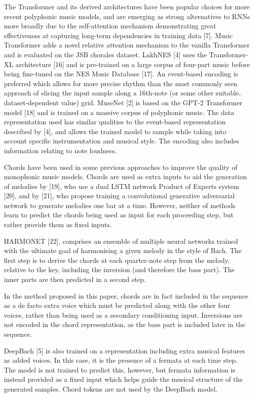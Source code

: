 \documentclass{article}
\begin{document}
The Transformer and its derived architectures have been popular choices for more recent polyphonic music models, and are emerging as strong alternatives to RNNs more broadly due to the self-attention mechanism demonstrating great effectiveness at capturing long-term dependencies in training data [7]. Music Transformer adds a novel relative attention mechanism to the vanilla Transformer and is evaluated on the JSB chorales dataset. LakhNES [4] uses the Transformer-XL architecture [16] and is pre-trained on a large corpus of four-part music before being fine-tuned on the NES Music Database [17]. An event-based encoding is preferred which allows for more precise rhythm than the most commonly seen approach of slicing the input sample along a 16th-note (or some other suitable, dataset-dependent value) grid. MuseNet [2] is based on the GPT-2 Transformer model [18] and is trained on a massive corpus of polyphonic music. The data representation used has similar qualities to the event-based representation described by [4], and allows the trained model to sample while taking into account specific instrumentation and musical style. The encoding also includes information relating to note loudness.

Chords have been used in some previous approaches to improve the quality of monophonic music models. Chords are used as extra inputs to aid the generation of melodies by [19], who use a dual LSTM network Product of Experts system [20], and by [21], who propose training a convolutional generative adversarial network to generate melodies one bar at a time. However, neither of methods learn to predict the chords being used as input for each proceeding step, but rather provide them as fixed inputs.

HARMONET [22], comprises an ensemble of multiple neural networks trained with the ultimate goal of harmonising a given melody in the style of Bach. The first step is to derive the chords at each quarter-note step from the melody, relative to the key, including the inversion (and therefore the bass part). The inner parts are then predicted in a second step. 

In the method proposed in this paper, chords are in fact included in the sequence as a de facto extra voice which must be predicted along with the other four voices, rather than being used as a secondary conditioning input. Inversions are not encoded in the chord representation, as the bass part is included later in the sequence.

DeepBach [5] is also trained on a representation including extra musical features as added voices. In this case, it is the presence of a fermata at each time step. The model is not trained to predict this, however, but fermata information is instead provided as a fixed input which helps guide the musical structure of the generated samples. Chord tokens are not used by the DeepBach model.
\end{document}
